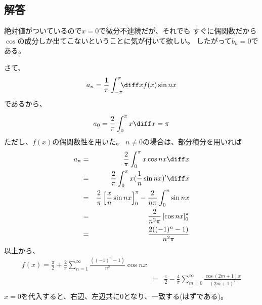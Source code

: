 \subsection{解答}


絶対値がついているので$x=0$で微分不連続だが、それでも
すぐに偶関数だから$\cos$の成分しか出てこないということに気が付いて欲しい。
したがって$b_n = 0$である。

さて、
\begin{equation}
  a_n = \frac{1}{ \pi} \int_{-\pi}^{\pi} \!\!\! \diff x f(x) \sin nx
\end{equation}
であるから、

\begin{equation}
  a_0 = \frac{2}{\pi} \int_0^{\pi} x \diff x  = \pi
\end{equation}
ただし、$f(x)$の偶関数性を用いた。
$n\neq 0$の場合は、部分積分を用いれば
\begin{eqnarray}
  a_n &=& \frac{2}{\pi} \int_0^{\pi} x \cos nx \diff x \\
  &=& \frac{2}{\pi} \int_0^{\pi} x (\frac{1}{n}\sin nx)' \diff x  \\
  &=& \frac{2}{\pi} \left[ \frac{x}{n} \sin nx \right]_0^{\pi}
  - \frac{2}{n\pi} \int_0^{\pi} \sin nx \\
  &=& \frac{2}{n^2\pi} \left[\cos nx \right]_0^{\pi}\\
  &=& \frac{2 ((-1)^n -1)}{n^2\pi}
\end{eqnarray}
以上から、
\begin{eqnarray}
  f(x) = \frac{\pi}{2} + \frac{2}{\pi} \sum_{n=1}^\infty \frac{((-1)^n -1)}{n^2} \cos nx \\
  &=&
  \frac{\pi}{2} - \frac{4}{\pi} \sum_{m=0}^\infty \frac{\cos (2m+1)x}{(2m+1)^2} \\
\end{eqnarray}
$x=0$を代入すると、右辺、左辺共に$0$となり、一致する(はずである)。

